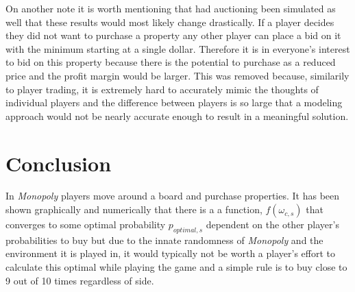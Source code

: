 \documentclass{article}
\begin{document}
On another note it is worth mentioning that had auctioning been simulated as well that these results would most likely change drastically.  If a player decides they did not want to purchase a property any other player can place a bid on it with the minimum starting at a single dollar.  Therefore it is in everyone's interest to bid on this property because there is the potential to purchase as a reduced price and the profit margin would be larger.  This was removed because, similarily to player trading, it is extremely hard to accurately mimic the thoughts of individual players and the difference between players is so large that a modeling approach would not be nearly accurate enough to result in a meaningful solution.

\section{Conclusion}

In \textit{Monopoly} players move around a board and purchase properties.  It has been shown graphically and numerically that there is a a function, $f(\omega_{c,s})$ that converges to some optimal probability $p_{optimal,s}$ dependent on the other player's probabilities to buy but due to the innate randomness of \textit{Monopoly} and the environment it is played in, it would typically not be worth a player's effort to calculate this optimal while playing the game and a simple rule is to buy close to 9 out of 10 times regardless of side.  
\end{document}
